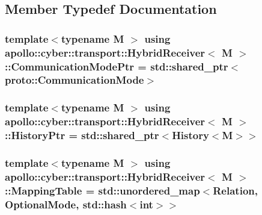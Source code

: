 \subsection{Member Typedef Documentation}
\hypertarget{classapollo_1_1cyber_1_1transport_1_1HybridReceiver_aec763c6c2f52e839f873b00193627626}{
\subsubsection[{Communication\-Mode\-Ptr}]{\setlength{\rightskip}{0pt plus 5cm}template$<$typename M $>$ using {\bf apollo\-::cyber\-::transport\-::\-Hybrid\-Receiver}$<$ M $>$\-::{\bf Communication\-Mode\-Ptr} =  std\-::shared\-\_\-ptr$<$proto\-::\-Communication\-Mode$>$}}\label{classapollo_1_1cyber_1_1transport_1_1HybridReceiver_aec763c6c2f52e839f873b00193627626}
\hypertarget{classapollo_1_1cyber_1_1transport_1_1HybridReceiver_a29d008855b7b25d060137a19da928c53}{
\subsubsection[{History\-Ptr}]{\setlength{\rightskip}{0pt plus 5cm}template$<$typename M $>$ using {\bf apollo\-::cyber\-::transport\-::\-Hybrid\-Receiver}$<$ M $>$\-::{\bf History\-Ptr} =  std\-::shared\-\_\-ptr$<${\bf History}$<$M$>$$>$}}\label{classapollo_1_1cyber_1_1transport_1_1HybridReceiver_a29d008855b7b25d060137a19da928c53}
\hypertarget{classapollo_1_1cyber_1_1transport_1_1HybridReceiver_abefb4dc42db917f5891670997814231c}{
\subsubsection[{Mapping\-Table}]{\setlength{\rightskip}{0pt plus 5cm}template$<$typename M $>$ using {\bf apollo\-::cyber\-::transport\-::\-Hybrid\-Receiver}$<$ M $>$\-::{\bf Mapping\-Table} =  std\-::unordered\-\_\-map$<${\bf Relation}, Optional\-Mode, std\-::hash$<$int$>$$>$}}\label{classapollo_1_1cyber_1_1transport_1_1HybridReceiver_abefb4dc42db917f5891670997814231c}

